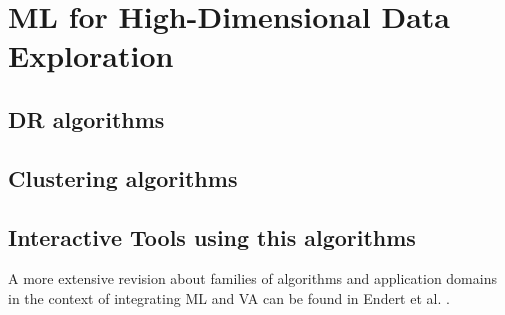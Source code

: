 \chapter{ML for High-Dimensional Data Exploration}
\label{chapter3}

\graphicspath{{Chapter3/figs/}}

\section{DR algorithms} %
\label{section3.1}



\section{Clustering algorithms} %
\label{section3.2}



\section{Interactive Tools using this algorithms} %
\label{section3.3}

A more extensive revision about families of algorithms and application domains in the context of integrating ML and VA can be found in Endert et al. \cite{Endert2017b}.
